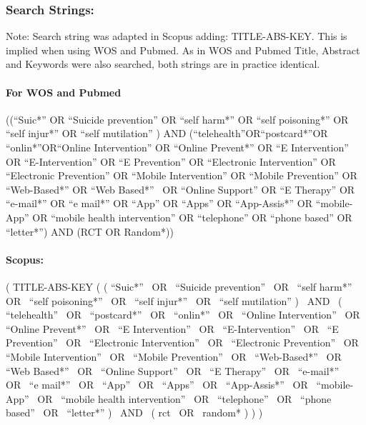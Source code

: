 \documentclass[
  english,
  man]{apa6}
\let\oldparagraph\paragraph
\renewcommand{\paragraph}[1]{\oldparagraph{#1}\mbox{}}
\begin{document}
\hypertarget{search-strings}{%
\subsubsection{Search Strings:}\label{search-strings}}

Note: Search string was adapted in Scopus adding: TITLE-ABS-KEY. This is implied when using WOS and Pubmed. As in WOS and Pubmed Title, Abstract and Keywords were also searched, both strings are in practice identical.

\hypertarget{for-wos-and-pubmed}{%
\paragraph{For WOS and Pubmed}\label{for-wos-and-pubmed}}

((``Suic*'' OR ``Suicide prevention'' OR ``self harm*'' OR ``self poisoning*'' OR ``self injur*'' OR ``self mutilation'' ) AND (``telehealth''OR``postcard*''OR ``onlin*''OR``Online Intervention'' OR ``Online Prevent*'' OR ``E Intervention'' OR ``E-Intervention'' OR ``E Prevention'' OR ``Electronic Intervention'' OR ``Electronic Prevention'' OR ``Mobile Intervention'' OR ``Mobile Prevention'' OR ``Web-Based*'' OR ``Web Based*''~ OR ``Online Support'' OR ``E Therapy'' OR ``e-mail*'' OR ``e mail*'' OR ``App'' OR ``Apps'' OR ``App-Assis*'' OR ``mobile-App'' OR ``mobile health intervention'' OR ``telephone'' OR ``phone based'' OR ``letter*'') AND (RCT OR Random*))

\hypertarget{scopus}{%
\paragraph{Scopus:}\label{scopus}}

( TITLE-ABS-KEY ( ( ``Suic*''~ OR~ ``Suicide prevention''~ OR~ ``self harm*''~ OR~ ``self poisoning*''~ OR~ ``self injur*''~ OR~ ``self mutilation'' )~ AND~ ( ``telehealth''~ OR~ ``postcard*''~ OR~ ``onlin*''~ OR~ ``Online Intervention''~ OR~ ``Online Prevent*''~ OR~ ``E Intervention''~ OR~ ``E-Intervention''~ OR~ ``E Prevention''~ OR~ ``Electronic Intervention''~ OR~ ``Electronic Prevention''~ OR~ ``Mobile Intervention''~ OR~ ``Mobile Prevention''~ OR~ ``Web-Based*''~ OR~ ``Web Based*''~ OR~ ``Online Support''~ OR~ ``E Therapy''~ OR~ ``e-mail*''~ OR~ ``e mail*''~ OR~ ``App''~ OR~ ``Apps''~ OR~ ``App-Assis*''~ OR~ ``mobile-App''~ OR~ ``mobile health intervention''~ OR~ ``telephone''~ OR~ ``phone based''~ OR~ ``letter*'' )~ AND~ ( rct~ OR~ random* ) ) )
\end{document}
